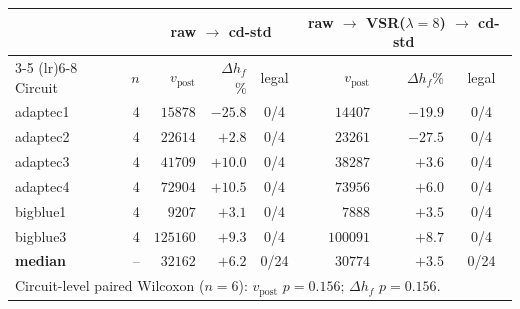 \begin{tabular}{lr|rrc|rrc}
\toprule
& & \multicolumn{3}{c|}{raw $\to$ cd-std} & \multicolumn{3}{c}{raw $\to$ VSR($\lambda{=}8$) $\to$ cd-std} \\
\cmidrule(lr){3-5} \cmidrule(lr){6-8}
Circuit & $n$ & $v_\text{post}$ & $\Delta h_f$\% & legal & $v_\text{post}$ & $\Delta h_f$\% & legal \\
\midrule
adaptec1 & 4 & $15878$ & $-25.8$ & 0/4 & $14407$ & $-19.9$ & 0/4 \\
adaptec2 & 4 & $22614$ & $+2.8$ & 0/4 & $23261$ & $-27.5$ & 0/4 \\
adaptec3 & 4 & $41709$ & $+10.0$ & 0/4 & $38287$ & $+3.6$ & 0/4 \\
adaptec4 & 4 & $72904$ & $+10.5$ & 0/4 & $73956$ & $+6.0$ & 0/4 \\
bigblue1 & 4 & $9207$ & $+3.1$ & 0/4 & $7888$ & $+3.5$ & 0/4 \\
bigblue3 & 4 & $125160$ & $+9.3$ & 0/4 & $100091$ & $+8.7$ & 0/4 \\
\midrule
\textbf{median} & -- & $32162$ & $+6.2$ & 0/24 & $30774$ & $+3.5$ & 0/24 \\
\multicolumn{8}{l}{Circuit-level paired Wilcoxon ($n{=}6$): $v_\text{post}$ $p=0.156$; $\Delta h_f$ $p=0.156$.} \\
\bottomrule
\end{tabular}
